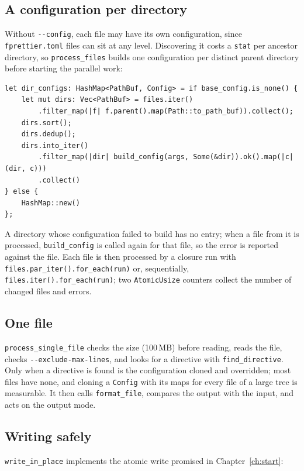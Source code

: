 \documentclass[11pt,a4paper,openany]{book}
\newcommand{\code}[1]{\texttt{\small #1}}
\newcommand{\file}[1]{\texttt{\small\color{accent}#1}}
\newcommand{\flag}[1]{\texttt{\small -{}-#1}}
\begin{document}
\subsection{A configuration per directory}

Without \flag{config}, each file may have its own configuration, since
\file{fprettier.toml} files can sit at any level. Discovering it costs a
\code{stat} per ancestor directory, so \code{process\_files} builds one
configuration per distinct parent directory before starting the parallel work:

\begin{lstlisting}[style=rust]
let dir_configs: HashMap<PathBuf, Config> = if base_config.is_none() {
    let mut dirs: Vec<PathBuf> = files.iter()
        .filter_map(|f| f.parent().map(Path::to_path_buf)).collect();
    dirs.sort();
    dirs.dedup();
    dirs.into_iter()
        .filter_map(|dir| build_config(args, Some(&dir)).ok().map(|c| (dir, c)))
        .collect()
} else {
    HashMap::new()
};
\end{lstlisting}

A directory whose configuration failed to build has no entry; when a file from
it is processed, \code{build\_config} is called again for that file, so the
error is reported against the file. Each file is then processed by a closure
run with \code{files.par\_iter().for\_each(run)} or, sequentially,
\code{files.iter().for\_each(run)}; two \code{AtomicUsize} counters
collect the number of changed files and errors.

\subsection{One file}

\code{process\_single\_file} checks the size (100\,MB) before reading, reads the
file, checks \flag{exclude-max-lines}, and looks for a directive with
\code{find\_directive}. Only when a directive is found is the configuration
cloned and overridden; most files have none, and cloning a \code{Config} with
its maps for every file of a large tree is measurable. It then calls
\code{format\_file}, compares the output with the input, and acts on the
output mode.

\subsection{Writing safely}

\code{write\_in\_place} implements the atomic write promised in
Chapter~\ref{ch:start}:
\end{document}
